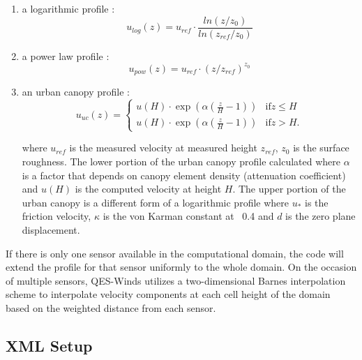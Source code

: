 \begin{enumerate}
\item a logarithmic profile \cite{favaloro2008toward}:
\begin{equation}
\label{eq:log_law}
u_{log}(z) = u_{ref}\cdot\frac{ln(z/z_0)}{ln(z_{ref}/z_0)}
\end{equation}

\item a power law profile \cite{favaloro2008toward}:
\begin{equation}
\label{eq:power_law}
u_{pow}(z) = u_{ref}\cdot(z/z_{ref})^{z_0}
\end{equation}

\item an urban canopy profile \cite{favaloro2008toward,pardyjak2008near}:
\begin{equation}
\label{eq:urban_canopy_low}
u_{uc}(z)=\begin{cases}
u(H)\cdot\exp(\alpha(\frac{z}{H}-1)) & \text{if} z\leq H\\
u(H)\cdot\exp(\alpha(\frac{z}{H}-1))& \text{if} z > H.
\end{cases}
\end{equation}

where $u_{ref}$ is the measured velocity at measured height $z_{ref}$, $z_0$ is the surface
roughness. The lower portion of the urban canopy profile calculated where $\alpha$ is a factor that depends on canopy
element density (attenuation coefficient) and $u(H)$ is the computed velocity at height $H$. The upper portion of the urban canopy is a different form of a logarithmic profile where $u_*$ is the friction velocity,
$\kappa$ is the von Karman constant at ~0.4 and $d$ is the zero plane displacement.

\end{enumerate}

If there is only one sensor available in the computational domain, the code will extend the profile for that sensor uniformly to the whole domain. On the occasion of multiple sensors, QES-Winds utilizes a two-dimensional Barnes interpolation scheme \cite{koch1983interactive,booth2012validation} to interpolate velocity components at each cell height of the domain based on the weighted distance from each sensor.

\subsection{XML Setup}
\label{sec:sensor_xml}

